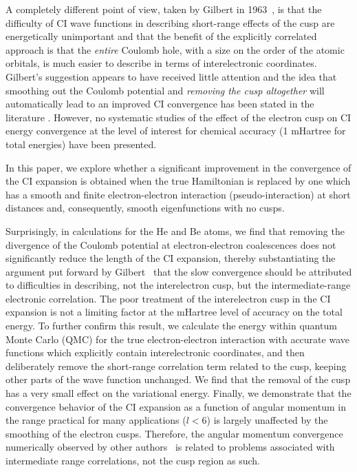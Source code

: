 A completely different point of view, taken by Gilbert in 1963~\cite{Gil63},
is that the difficulty of CI wave functions in describing short-range 
effects of the cusp are energetically unimportant and that the 
benefit of the explicitly correlated approach is that the {\em entire} 
Coulomb hole, with a size on the order of the atomic orbitals, is 
much easier to describe in terms of interelectronic coordinates.
Gilbert's suggestion appears to have received little attention and the 
idea that smoothing out the Coulomb potential and {\em removing the cusp 
altogether} will automatically lead to an improved CI convergence has 
been stated in the literature \cite{King,NooBar}.
However, no systematic studies of the effect of the electron cusp 
on CI energy convergence at the level of interest for chemical 
accuracy (1 mHartree for total energies) have been presented.

In this paper, we explore whether a significant improvement in the 
convergence of the CI expansion is obtained when the true Hamiltonian 
is replaced by one which has a smooth and finite electron-electron 
interaction (pseudo-interaction) at short distances and, 
consequently, smooth eigenfunctions with no cusps.

Surprisingly, in calculations for the He and Be atoms, we
find that removing the divergence of the Coulomb potential
at electron-electron coalescences does not significantly reduce 
the length of the CI expansion, thereby substantiating the argument 
put forward by Gilbert~\cite{Gil63} that the slow convergence should 
be attributed to difficulties in describing, not the interelectron 
cusp, but the intermediate-range electronic correlation.
The poor treatment of the interelectron cusp in the CI expansion
is not a limiting factor at the mHartree level of accuracy on 
the total energy.
To further confirm this result, we calculate the energy within 
quantum Monte Carlo (QMC) for the true electron-electron 
interaction with accurate wave functions which explicitly 
contain interelectronic coordinates, and then deliberately remove the 
short-range correlation term related to the cusp, keeping other parts 
of the wave function unchanged. We find that the removal of the cusp
has a very small effect on the variational energy.
Finally, we demonstrate that the convergence behavior of the CI expansion
as a function of angular momentum in the range practical for many 
applications ($l<6$) is largely unaffected by the smoothing of the 
electron cusps.
Therefore, the angular momentum convergence numerically observed 
by other authors~\cite{Helgaker} is related to problems associated 
with intermediate range correlations, not the cusp region as such.

